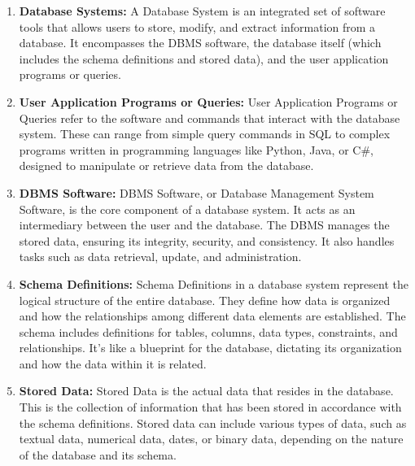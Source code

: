 \begin{enumerate}
    \item \textbf{Database Systems:} A Database System is an integrated set of software tools that allows users to store, modify, and extract information from a database. It encompasses the DBMS software, the database itself (which includes the schema definitions and stored data), and the user application programs or queries.
    \item \textbf{User Application Programs or Queries:} User Application Programs or Queries refer to the software and commands that interact with the database system. These can range from simple query commands in SQL to complex programs written in programming languages like Python, Java, or C\#, designed to manipulate or retrieve data from the database.
    \item \textbf{DBMS Software:} DBMS Software, or Database Management System Software, is the core component of a database system. It acts as an intermediary between the user and the database. The DBMS manages the stored data, ensuring its integrity, security, and consistency. It also handles tasks such as data retrieval, update, and administration.
    \item \textbf{Schema Definitions:} Schema Definitions in a database system represent the logical structure of the entire database. They define how data is organized and how the relationships among different data elements are established. The schema includes definitions for tables, columns, data types, constraints, and relationships. It's like a blueprint for the database, dictating its organization and how the data within it is related.
    \item \textbf{Stored Data:} Stored Data is the actual data that resides in the database. This is the collection of information that has been stored in accordance with the schema definitions. Stored data can include various types of data, such as textual data, numerical data, dates, or binary data, depending on the nature of the database and its schema.
\end{enumerate}

